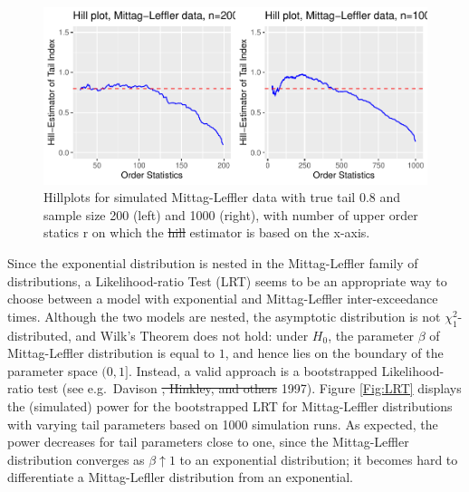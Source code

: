 \documentclass[]{elsarticle} %
\providecommand{\DIFaddtex}[1]{{\protect\color{blue}\uwave{#1}}} %
\providecommand{\DIFdeltex}[1]{{\protect\color{red}\sout{#1}}}                      %
\providecommand{\DIFaddbegin}{} %
\providecommand{\DIFaddend}{} %
\providecommand{\DIFdelbegin}{} %
\providecommand{\DIFdelend}{} %
\providecommand{\DIFaddFL}[1]{\DIFadd{#1}} %
\providecommand{\DIFdelFL}[1]{\DIFdel{#1}} %
\providecommand{\DIFaddbeginFL}{} %
\providecommand{\DIFaddendFL}{} %
\providecommand{\DIFdelbeginFL}{} %
\providecommand{\DIFdelendFL}{} %
\providecommand{\DIFadd}[1]{\texorpdfstring{\DIFaddtex{#1}}{#1}} %
\providecommand{\DIFdel}[1]{\texorpdfstring{\DIFdeltex{#1}}{}} %
\newcommand{\DIFscaledelfig}{0.5}
\newlength{\DIFdelgraphicswidth} %
\newlength{\DIFdelgraphicsheight} %
\newcommand{\DIFaddincludegraphics}[2][]{{\color{blue}\fbox{\DIFOincludegraphics[#1]{#2}}}} %
\newcommand{\DIFdelincludegraphics}[2][]{%
\sbox{\DIFdelgraphicsbox}{\DIFOincludegraphics[#1]{#2}}%
\settoboxwidth{\DIFdelgraphicswidth}{\DIFdelgraphicsbox} %
\settoboxtotalheight{\DIFdelgraphicsheight}{\DIFdelgraphicsbox} %
\scalebox{\DIFscaledelfig}{%
\parbox[b]{\DIFdelgraphicswidth}{\usebox{\DIFdelgraphicsbox}\\[-\baselineskip] \rule{\DIFdelgraphicswidth}{0em}}\llap{\resizebox{\DIFdelgraphicswidth}{\DIFdelgraphicsheight}{%
\setlength{\unitlength}{\DIFdelgraphicswidth}%
\begin{picture}(1,1)%
\thicklines\linethickness{2pt} %
{\color[rgb]{1,0,0}\put(0,0){\framebox(1,1){}}}%
{\color[rgb]{1,0,0}\put(0,0){\line( 1,1){1}}}%
{\color[rgb]{1,0,0}\put(0,1){\line(1,-1){1}}}%
\end{picture}%
}\hspace*{3pt}}} %
} %
\DeclareRobustCommand{\DIFaddbegin}{\DIFOaddbegin \let\includegraphics\DIFaddincludegraphics} %
\DeclareRobustCommand{\DIFaddend}{\DIFOaddend \let\includegraphics\DIFOincludegraphics} %
\DeclareRobustCommand{\DIFdelbegin}{\DIFOdelbegin \let\includegraphics\DIFdelincludegraphics} %
\DeclareRobustCommand{\DIFdelend}{\DIFOaddend \let\includegraphics\DIFOincludegraphics} %
\DeclareRobustCommand{\DIFaddbeginFL}{\DIFOaddbeginFL \let\includegraphics\DIFaddincludegraphics} %
\DeclareRobustCommand{\DIFaddendFL}{\DIFOaddendFL \let\includegraphics\DIFOincludegraphics} %
\DeclareRobustCommand{\DIFdelbeginFL}{\DIFOdelbeginFL \let\includegraphics\DIFdelincludegraphics} %
\DeclareRobustCommand{\DIFdelendFL}{\DIFOaddendFL \let\includegraphics\DIFOincludegraphics} %
\begin{document}
\begin{figure}

{\centering \includegraphics[width=0.9\linewidth]{article_springer_files/figure-latex/Hillplots-1} 

}

\caption{\label{fig:Hillplots} Hillplots for simulated Mittag-Leffler data with true tail 0.8 and sample size 200 (left) and 1000 (right), with number of upper order statics r on which the \DIFdelbeginFL \DIFdelFL{hill }\DIFdelendFL \DIFaddbeginFL \DIFaddFL{Hill }\DIFaddendFL estimator is based on the x-axis. }\label{fig:Hillplots}
\end{figure}

Since the exponential distribution is nested in the Mittag-Leffler
family of distributions, a Likelihood-ratio Test (LRT) seems to be an
appropriate way to choose between a model with exponential and
Mittag-Leffler inter-exceedance times. Although the two models are
nested, the asymptotic distribution is not \(\chi^2_1\)-distributed, and
Wilk's Theorem does not hold: under \(H_0\), the parameter \(\beta\) of
Mittag-Leffler distribution is equal to \(1\), and hence lies on the
boundary of the parameter space \((0,1]\). Instead, a valid approach is
a bootstrapped Likelihood-ratio test (see e.g.~Davison \DIFdelbegin \DIFdel{, Hinkley, and
others }\DIFdelend \DIFaddbegin \DIFadd{et al., }\DIFaddend 1997).
Figure \ref{Fig:LRT} displays the (simulated) power for the bootstrapped
LRT for Mittag-Leffler distributions with varying tail parameters based
on 1000 simulation runs. As expected, the power decreases for tail
parameters close to one, since the Mittag-Leffler distribution converges
as \(\beta \uparrow 1\) to an exponential distribution; it becomes hard
to differentiate a Mittag-Lefller distribution from an exponential.
\end{document}
